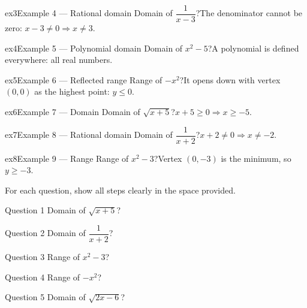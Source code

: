 \documentclass[11pt]{article}
\begin{document}
\begin{example}{ex3}{Example 4 --- Rational domain}
Domain of $\dfrac{1}{x-3}$?\soln The denominator cannot be zero: $x-3\ne0\Rightarrow x\ne3$.
\end{example}

\begin{example}{ex4}{Example 5 --- Polynomial domain}
Domain of $x^2-5$?\soln A polynomial is defined everywhere: all real numbers.
\end{example}

\begin{example}{ex5}{Example 6 --- Reflected range}
Range of $-x^2$?\soln It opens down with vertex $(0,0)$ as the highest point: $y\le0$.
\end{example}

\begin{example}{ex6}{Example 7 --- Domain}
Domain of $\sqrt{x+5}$?\soln $x+5\ge0\Rightarrow x\ge-5$.
\end{example}

\begin{example}{ex7}{Example 8 --- Rational domain}
Domain of $\dfrac{1}{x+2}$?\soln $x+2\ne0\Rightarrow x\ne-2$.
\end{example}

\begin{example}{ex8}{Example 9 --- Range}
Range of $x^2-3$?\soln Vertex $(0,-3)$ is the minimum, so $y\ge-3$.
\end{example}

\clearpage
{}
For each question, show all steps clearly in the space provided.

\begin{qbox}{Question 1}
Domain of $\sqrt{x+5}$?\workspace{2.4cm}
\end{qbox}

\begin{qbox}{Question 2}
Domain of $\dfrac{1}{x+2}$?\workspace{2.4cm}
\end{qbox}

\begin{qbox}{Question 3}
Range of $x^2-3$?\workspace{2.4cm}
\end{qbox}

\begin{qbox}{Question 4}
Range of $-x^2$?\workspace{2.4cm}
\end{qbox}

\begin{qbox}{Question 5}
Domain of $\sqrt{2x-6}$?\workspace{2.4cm}
\end{qbox}
\end{document}
